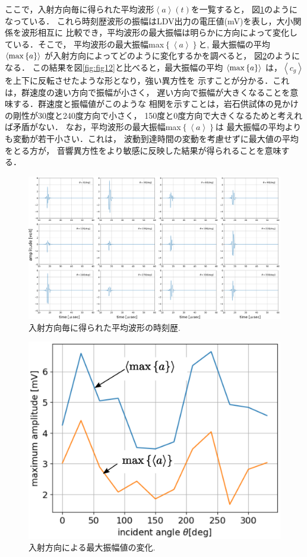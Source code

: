 ここで，入射方向毎に得られた平均波形$\left<a\right>(t)$を一覧すると，
図\ref{fig:fig11_1}のようになっている．
これら時刻歴波形の振幅はLDV出力の電圧値(mV)を表し，大小関係を波形相互に
比較でき，平均波形の最大振幅は明らかに方向によって変化している．そこで，
平均波形の最大振幅max$\left\{ \left< a \right>\right\}$と,
最大振幅の平均$\left< {\rm max}\left\{ a \right\} \right>$
が入射方向によってどのように変化するかを調べると，
図\ref{fig:fig14}のようになる．
この結果を図\ref{fig:fig12}と比べると，最大振幅の平均
$\left<{\rm max}\left\{a\right\}\right>$
は，$\left<c_g\right>$を上下に反転させたような形となり，強い異方性を
示すことが分かる．これは，群速度の速い方向で振幅が小さく，
遅い方向で振幅が大きくなることを意味する．群速度と振幅値がこのような
相関を示すことは，岩石供試体の見かけの剛性が30度と240度方向で小さく，
150度と0度方向で大きくなるためと考えれば矛盾がない．
なお，平均波形の最大振幅max$\left\{\left<a\right>\right\}$は
最大振幅の平均よりも変動が若干小さい．これは，
波動到達時間の変動を考慮せずに最大値の平均をとる方が，
音響異方性をより敏感に反映した結果が得られることを意味する．
\begin{figure}[h]
	\begin{center}
	\includegraphics[width=1.0\linewidth]{Figs/fig11_1.eps} 
	\end{center}
	\caption{
		入射方向毎に得られた平均波形の時刻歴.
	} 
	\label{fig:fig11_1}
\end{figure}
\begin{figure}[h]
	\begin{center}
	\includegraphics[width=0.8\linewidth]{Figs/fig14.eps} 
	\end{center}
	\caption{
		入射方向による最大振幅値の変化.
	} 
	\label{fig:fig14}
\end{figure}
